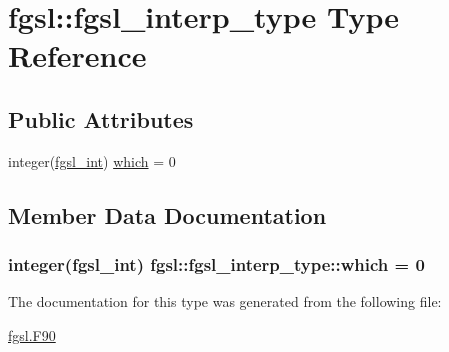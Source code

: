 \hypertarget{structfgsl_1_1fgsl__interp__type}{\section{fgsl\-:\-:fgsl\-\_\-interp\-\_\-type Type Reference}
\label{structfgsl_1_1fgsl__interp__type}
}
\subsection*{Public Attributes}
\begin{DoxyCompactItemize}
\item 
integer(\hyperlink{classfgsl_a222deda1d7a0c0e845ce4a683318efeb}{fgsl\-\_\-int}) \hyperlink{structfgsl_1_1fgsl__interp__type_abedd1c0d310936d4ee2f422ed0cd51ed}{which} = 0
\end{DoxyCompactItemize}


\subsection{Member Data Documentation}
\hypertarget{structfgsl_1_1fgsl__interp__type_abedd1c0d310936d4ee2f422ed0cd51ed}{
\subsubsection[{which}]{\setlength{\rightskip}{0pt plus 5cm}integer({\bf fgsl\-\_\-int}) fgsl\-::fgsl\-\_\-interp\-\_\-type\-::which = 0}}\label{structfgsl_1_1fgsl__interp__type_abedd1c0d310936d4ee2f422ed0cd51ed}


The documentation for this type was generated from the following file\-:\begin{DoxyCompactItemize}
\item 
\hyperlink{fgsl_8F90}{fgsl.\-F90}\end{DoxyCompactItemize}
